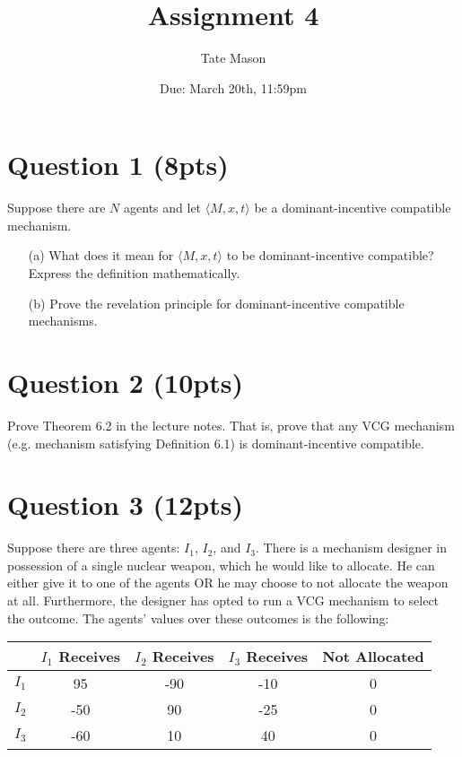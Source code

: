 \documentclass[10pt,a4paper]{article}
\begin{document}
\title{Assignment 4}
\author{Tate Mason}
\date{Due: March 20th, 11:59pm}
\maketitle

\section*{Question 1 (8pts)}
  Suppose there are $N$ agents and let $\langle M, x, t \rangle$ be a dominant-incentive compatible mechanism.

  \begin{enumerate}
      \item[(a)] What does it mean for $\langle M, x, t \rangle$ to be dominant-incentive compatible? Express the definition mathematically.
      \item[(b)] Prove the revelation principle for dominant-incentive compatible mechanisms.
  \end{enumerate}

\section*{Question 2 (10pts)}
  Prove Theorem 6.2 in the lecture notes. That is, prove that any VCG mechanism (e.g. mechanism satisfying Definition 6.1) is dominant-incentive compatible.

\section*{Question 3 (12pts)}
  Suppose there are three agents: $I_1$, $I_2$, and $I_3$. There is a mechanism designer in possession of a single nuclear weapon, which he would like to allocate. He can either give it to one of the agents OR he may choose to not allocate the weapon at all. Furthermore, the designer has opted to run a VCG mechanism to select the outcome. The agents' values over these outcomes is the following:

  \begin{center}
    \begin{tabular}{|c|c|c|c|c|}
      \hline
      & \textbf{$I_1$ Receives} & \textbf{$I_2$ Receives} & \textbf{$I_3$ Receives} & \textbf{Not Allocated} \\
      \hline
      $I_1$ & 95 & -90 & -10 & 0 \\
      \hline
      $I_2$ & -50 & 90 & -25 & 0 \\
      \hline
      $I_3$ & -60 & 10 & 40 & 0 \\
      \hline
    \end{tabular}
  \end{center}
\end{document}

